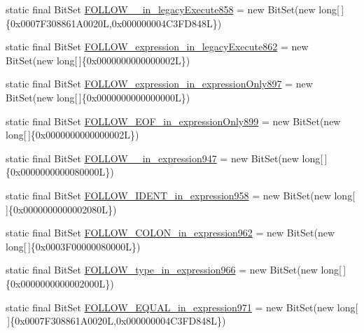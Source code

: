 \begin{DoxyCompactItemize}
\item 
static final Bit\-Set \hyperlink{classorg_1_1tzi_1_1use_1_1parser_1_1shell_1_1_shell_command_parser_aa3780f55219ad512330f65712ae5ffb6}{F\-O\-L\-L\-O\-W\-\_\-\_\-in\-\_\-legacy\-Execute858} = new Bit\-Set(new long\mbox{[}$\,$\mbox{]}\{0x0007\-F308861\-A0020\-L,0x000000004\-C3\-F\-D848\-L\})
\item 
static final Bit\-Set \hyperlink{classorg_1_1tzi_1_1use_1_1parser_1_1shell_1_1_shell_command_parser_a93186f2b490690472bbed03361d50966}{F\-O\-L\-L\-O\-W\-\_\-expression\-\_\-in\-\_\-legacy\-Execute862} = new Bit\-Set(new long\mbox{[}$\,$\mbox{]}\{0x0000000000000002\-L\})
\item 
static final Bit\-Set \hyperlink{classorg_1_1tzi_1_1use_1_1parser_1_1shell_1_1_shell_command_parser_aba475795bdca3fbc3c9fb95ecb659917}{F\-O\-L\-L\-O\-W\-\_\-expression\-\_\-in\-\_\-expression\-Only897} = new Bit\-Set(new long\mbox{[}$\,$\mbox{]}\{0x0000000000000000\-L\})
\item 
static final Bit\-Set \hyperlink{classorg_1_1tzi_1_1use_1_1parser_1_1shell_1_1_shell_command_parser_af787c445e6dd42f88105e3386a4a5182}{F\-O\-L\-L\-O\-W\-\_\-\-E\-O\-F\-\_\-in\-\_\-expression\-Only899} = new Bit\-Set(new long\mbox{[}$\,$\mbox{]}\{0x0000000000000002\-L\})
\item 
static final Bit\-Set \hyperlink{classorg_1_1tzi_1_1use_1_1parser_1_1shell_1_1_shell_command_parser_ab7ae2e2665044bd28bce7c354283d6d6}{F\-O\-L\-L\-O\-W\-\_\-\_\-in\-\_\-expression947} = new Bit\-Set(new long\mbox{[}$\,$\mbox{]}\{0x0000000000080000\-L\})
\item 
static final Bit\-Set \hyperlink{classorg_1_1tzi_1_1use_1_1parser_1_1shell_1_1_shell_command_parser_a5237628cd8259b59e1b31076b9544ae8}{F\-O\-L\-L\-O\-W\-\_\-\-I\-D\-E\-N\-T\-\_\-in\-\_\-expression958} = new Bit\-Set(new long\mbox{[}$\,$\mbox{]}\{0x0000000000002080\-L\})
\item 
static final Bit\-Set \hyperlink{classorg_1_1tzi_1_1use_1_1parser_1_1shell_1_1_shell_command_parser_a7183359e16064360ea31acc2e0af62c8}{F\-O\-L\-L\-O\-W\-\_\-\-C\-O\-L\-O\-N\-\_\-in\-\_\-expression962} = new Bit\-Set(new long\mbox{[}$\,$\mbox{]}\{0x0003\-F00000080000\-L\})
\item 
static final Bit\-Set \hyperlink{classorg_1_1tzi_1_1use_1_1parser_1_1shell_1_1_shell_command_parser_a5f225c912512dfc6d7652b4552daeb50}{F\-O\-L\-L\-O\-W\-\_\-type\-\_\-in\-\_\-expression966} = new Bit\-Set(new long\mbox{[}$\,$\mbox{]}\{0x0000000000002000\-L\})
\item 
static final Bit\-Set \hyperlink{classorg_1_1tzi_1_1use_1_1parser_1_1shell_1_1_shell_command_parser_a70f7be4d0cce72e9a211e1f3bfa1f198}{F\-O\-L\-L\-O\-W\-\_\-\-E\-Q\-U\-A\-L\-\_\-in\-\_\-expression971} = new Bit\-Set(new long\mbox{[}$\,$\mbox{]}\{0x0007\-F308861\-A0020\-L,0x000000004\-C3\-F\-D848\-L\})

\end{DoxyCompactItemize}
